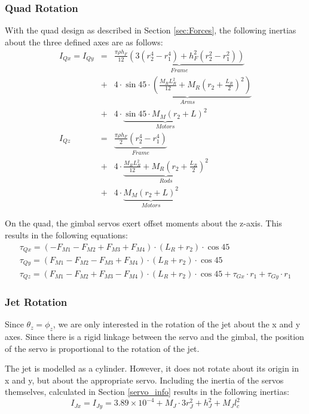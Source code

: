 \documentclass[11pt]{article}
\begin{document}
\subsubsection{Quad Rotation}
With the quad design as described in Section \ref{sec:Forces}, the following inertias about the three defined axes are as follows:
\begin{eqnarray}
    I_{Qx} = I_{Qy} & = & \underbrace{\frac{\pi \rho h_F}{12}(3(r_2^4-r_1^4) + h_F^2(r_2^2-r_1^2))}_{Frame} \nonumber \\ & + & 4 \cdot \underbrace{\sin 45 \cdot (\frac{M_R L_R^2}{12}+M_R(r_2+\frac{L_R}{2})^2)}_{Arms} \nonumber \\ & + & 4 \cdot \underbrace{\sin 45 \cdot M_M(r_2+L)^2}_{Motors} \\
    I_{Qz} & = & \underbrace{\frac{\pi \rho h_F}{2}(r_2^4-r_1^4)}_{Frame} \nonumber \\ & + & 4 \cdot \underbrace{\frac{M_RL_R^2}{12} + M_R(r_2+\frac{L_R}{2})^2}_{Rods} \nonumber \\ & + & 4 \cdot \underbrace{M_M(r_2+L)^2}_{Motors}
\end{eqnarray}

On the quad, the gimbal servos exert offset moments about the z-axis. This results in the following equations:
\begin{eqnarray}
    \tau_{Qx} = (-F_{M1} - F_{M2} + F_{M3} + F_{M4})\cdot(L_R + r_2)\cdot \cos{45} \\
    \tau_{Qy} = (F_{M1} - F_{M2} - F_{M3} + F_{M4})\cdot(L_R + r_2)\cdot \cos{45} \\
    \tau_{Qz} = (F_{M1} - F_{M2} + F_{M3} - F_{M4})\cdot(L_R + r_2)\cdot \cos{45} + \tau_{Gx}\cdot r_1 + \tau_{Gy}\cdot r_1
\end{eqnarray}

\subsubsection{Jet Rotation}
Since $\theta_z = \phi_z$, we are only interested in the rotation of the jet about the x and y axes. Since there is a rigid linkage between the servo and the gimbal, the position of the servo is proportional to the rotation of the jet.

The jet is modelled as a cylinder. However, it does not rotate about its origin in x and y, but about the appropriate servo. Including the inertia of the servos themselves, calculated in Section \ref{servo_info} results in the following inertias:
\begin{equation}
    I_{Jx} = I_{Jy} = 3.89\times10^{-4} + M_J\cdot3r_J^2 + h_J^2 + M_Jl_c^2
\end{equation}
\end{document}
